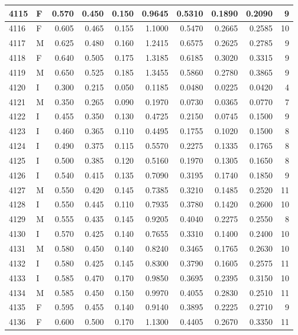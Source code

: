 \documentclass[9pt,twocolumn,twoside,]{pnas-new}
\begin{document}
\begin{tabular}{l|l|r|r|r|r|r|r|r|r}
\hline
4115 & F & 0.570 & 0.450 & 0.150 & 0.9645 & 0.5310 & 0.1890 & 0.2090 & 9\\
\hline
4116 & F & 0.605 & 0.465 & 0.155 & 1.1000 & 0.5470 & 0.2665 & 0.2585 & 10\\
\hline
4117 & M & 0.625 & 0.480 & 0.160 & 1.2415 & 0.6575 & 0.2625 & 0.2785 & 9\\
\hline
4118 & F & 0.640 & 0.505 & 0.175 & 1.3185 & 0.6185 & 0.3020 & 0.3315 & 9\\
\hline
4119 & M & 0.650 & 0.525 & 0.185 & 1.3455 & 0.5860 & 0.2780 & 0.3865 & 9\\
\hline
4120 & I & 0.300 & 0.215 & 0.050 & 0.1185 & 0.0480 & 0.0225 & 0.0420 & 4\\
\hline
4121 & M & 0.350 & 0.265 & 0.090 & 0.1970 & 0.0730 & 0.0365 & 0.0770 & 7\\
\hline
4122 & I & 0.455 & 0.350 & 0.130 & 0.4725 & 0.2150 & 0.0745 & 0.1500 & 9\\
\hline
4123 & I & 0.460 & 0.365 & 0.110 & 0.4495 & 0.1755 & 0.1020 & 0.1500 & 8\\
\hline
4124 & I & 0.490 & 0.375 & 0.115 & 0.5570 & 0.2275 & 0.1335 & 0.1765 & 8\\
\hline
4125 & I & 0.500 & 0.385 & 0.120 & 0.5160 & 0.1970 & 0.1305 & 0.1650 & 8\\
\hline
4126 & I & 0.540 & 0.415 & 0.135 & 0.7090 & 0.3195 & 0.1740 & 0.1850 & 9\\
\hline
4127 & M & 0.550 & 0.420 & 0.145 & 0.7385 & 0.3210 & 0.1485 & 0.2520 & 11\\
\hline
4128 & I & 0.550 & 0.445 & 0.110 & 0.7935 & 0.3780 & 0.1420 & 0.2600 & 10\\
\hline
4129 & M & 0.555 & 0.435 & 0.145 & 0.9205 & 0.4040 & 0.2275 & 0.2550 & 8\\
\hline
4130 & I & 0.570 & 0.425 & 0.140 & 0.7655 & 0.3310 & 0.1400 & 0.2400 & 10\\
\hline
4131 & M & 0.580 & 0.450 & 0.140 & 0.8240 & 0.3465 & 0.1765 & 0.2630 & 10\\
\hline
4132 & I & 0.580 & 0.425 & 0.145 & 0.8300 & 0.3790 & 0.1605 & 0.2575 & 11\\
\hline
4133 & I & 0.585 & 0.470 & 0.170 & 0.9850 & 0.3695 & 0.2395 & 0.3150 & 10\\
\hline
4134 & M & 0.585 & 0.450 & 0.150 & 0.9970 & 0.4055 & 0.2830 & 0.2510 & 11\\
\hline
4135 & F & 0.595 & 0.455 & 0.140 & 0.9140 & 0.3895 & 0.2225 & 0.2710 & 9\\
\hline
4136 & F & 0.600 & 0.500 & 0.170 & 1.1300 & 0.4405 & 0.2670 & 0.3350 & 11\\

\end{tabular}
\end{document}
